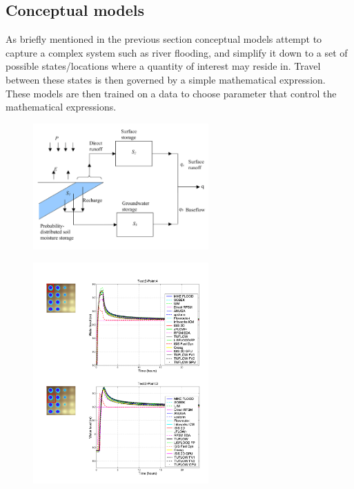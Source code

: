 \documentclass[11pt]{article}
\begin{document}
\subsection{Conceptual models}

 As briefly mentioned in the previous section conceptual models attempt to capture a complex system such as river flooding, and simplify it down to a set of possible states/locations where a quantity of interest may reside in. Travel between these states is then governed by a simple mathematical expression. These models are then trained on a data to choose parameter that control the mathematical expressions.
 
 \begin{minipage}{0.5\textwidth}
    \begin{figure}[H]
        \centering
        \includegraphics[width=0.6\textwidth]{Figs/Concept.png}
        \label{fig:conceptual}
    \end{figure}
    \begin{figure}[H]
        \centering
        \includegraphics[width=0.6\textwidth]{Figs/EA_bench.png}
        \label{fig:eaBench}
    \end{figure}
\end{minipage}
\end{document}
